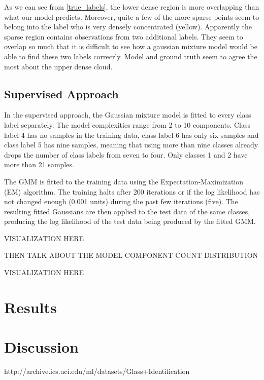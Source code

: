 \documentclass[a4paper]{article}
\begin{document}
As we can see from \ref{true_labels}, the lower dense region is more overlapping than what our model predicts. Moreover,  quite a few of the more sparse points seem to belong into the label who is very densely concentrated (yellow). Apparently the sparse region contains observations from two additional labels. They seem to overlap so much that it is difficult to see how a gaussian mixture model would be able to find these two labels correcrly. Model and ground truth seem to agree the most about the upper dense cloud. 



\subsection{Supervised Approach}

In the supervised approach, the Gaussian mixture model is fitted to every
class label separately. The model complexities range from 2 to 10 components.
Class label 4 has no samples in the training data, class label 6 has only six
samples and class label 5 has nine samples, meaning that using more than nine
classes already drops the number of class labels from seven to four. Only
classes 1 and 2 have more than 21 samples.

\par
The GMM is fitted to the training data using the Expectation-Maximization (EM)
algorithm. The training halts after 200 iterations or if the log likelihood
has not changed enough (0.001 units) during the past few iterations (five).
The resulting fitted Gaussians are then applied to the test data of the same
classes, producing the log likelihood of the test data being produced by the
fitted GMM.

\par
VISUALIZATION HERE

\par
THEN TALK ABOUT THE MODEL COMPONENT COUNT DISTRIBUTION

\par
VISUALIZATION HERE

\section{Results}

\section{Discussion}

\par
[1] http://archive.ics.uci.edu/ml/datasets/Glass+Identification
\end{document}
